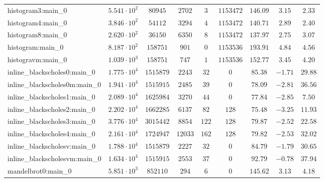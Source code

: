 \begin{tabular}{|l|c|c|c|c|c|c|c|c|}
histogram3:main\_0             & $ 5.541 \cdot 10^{2} $ & $ 80945    $ & $ 2702   $ & $ 3    $ & $ 1153472  $ & $ 146.09      $ & $ 3.15    $ & $ 2.33    $ \\
histogram4:main\_0             & $ 3.846 \cdot 10^{2} $ & $ 54112    $ & $ 3294   $ & $ 4    $ & $ 1153472  $ & $ 140.71      $ & $ 2.89    $ & $ 2.40    $ \\
histogram8:main\_0             & $ 2.620 \cdot 10^{2} $ & $ 36150    $ & $ 6350   $ & $ 8    $ & $ 1153472  $ & $ 137.97      $ & $ 2.75    $ & $ 3.07    $ \\
histogram:main\_0              & $ 8.187 \cdot 10^{2} $ & $ 158751   $ & $ 901    $ & $ 0    $ & $ 1153536  $ & $ 193.91      $ & $ 4.84    $ & $ 4.56    $ \\
histogravm:main\_0             & $ 1.039 \cdot 10^{3} $ & $ 158751   $ & $ 747    $ & $ 1    $ & $ 1153536  $ & $ 152.77      $ & $ 3.45    $ & $ 4.20    $ \\
inline\_blackscholes0:main\_0  & $ 1.775 \cdot 10^{4} $ & $ 1515879  $ & $ 2243   $ & $ 32   $ & $ 0        $ & $ 85.38       $ & $ -1.71   $ & $ 29.88   $ \\
inline\_blackscholes0m:main\_0 & $ 1.941 \cdot 10^{4} $ & $ 1515915  $ & $ 2485   $ & $ 39   $ & $ 0        $ & $ 78.09       $ & $ -2.81   $ & $ 36.56   $ \\
inline\_blackscholes1:main\_0  & $ 2.089 \cdot 10^{4} $ & $ 1625984  $ & $ 3270   $ & $ 44   $ & $ 0        $ & $ 77.84       $ & $ -2.85   $ & $ 7.50    $ \\
inline\_blackscholes2:main\_0  & $ 2.202 \cdot 10^{4} $ & $ 1662285  $ & $ 6137   $ & $ 82   $ & $ 128      $ & $ 75.48       $ & $ -3.25   $ & $ 11.93   $ \\
inline\_blackscholes3:main\_0  & $ 3.776 \cdot 10^{4} $ & $ 3015442  $ & $ 8854   $ & $ 122  $ & $ 128      $ & $ 79.87       $ & $ -2.52   $ & $ 22.58   $ \\
inline\_blackscholes4:main\_0  & $ 2.161 \cdot 10^{4} $ & $ 1724947  $ & $ 12033  $ & $ 162  $ & $ 128      $ & $ 79.82       $ & $ -2.53   $ & $ 32.02   $ \\
inline\_blackscholesv:main\_0  & $ 1.788 \cdot 10^{4} $ & $ 1515879  $ & $ 2227   $ & $ 32   $ & $ 0        $ & $ 84.79       $ & $ -1.79   $ & $ 30.65   $ \\
inline\_blackscholesvm:main\_0 & $ 1.634 \cdot 10^{4} $ & $ 1515915  $ & $ 2553   $ & $ 37   $ & $ 0        $ & $ 92.79       $ & $ -0.78   $ & $ 37.94   $ \\
mandelbrot0:main\_0            & $ 5.851 \cdot 10^{3} $ & $ 852110   $ & $ 294    $ & $ 6    $ & $ 0        $ & $ 145.62      $ & $ 3.13    $ & $ 4.18    $ \\

\end{tabular}
